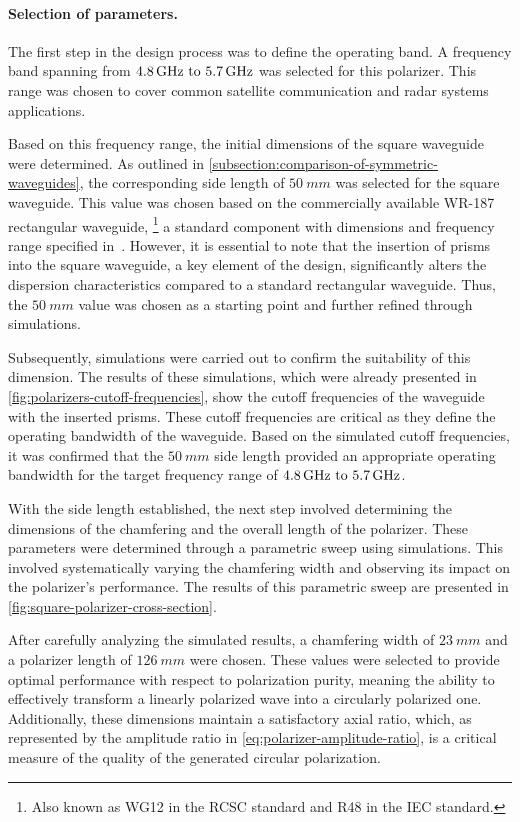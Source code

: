 \documentclass[14pt,a4paper]{ntust_report}
\begin{document}
\paragraph{Selection of parameters.} The first step in the design process was to define the operating band. A frequency band spanning from $\frequencyrange$ was selected for this polarizer. This range was chosen to cover common satellite communication and radar systems applications.

Based on this frequency range, the initial dimensions of the square waveguide were determined. As outlined in \cref{subsection:comparison-of-symmetric-waveguides}, the corresponding side length of $\qty{50}{mm}$ was selected for the square waveguide. This value was chosen based on the commercially available WR-187 rectangular waveguide,
    \footnote{Also known as WG12 in the RCSC standard and R48 in the IEC standard.}
a standard component with dimensions and frequency range specified in~\parencite{spinner:waveguide-specifications}. However, it is essential to note that the insertion of prisms into the square waveguide, a key element of the design, significantly alters the dispersion characteristics compared to a standard rectangular waveguide. Thus, the $\qty{50}{mm}$ value was chosen as a starting point and further refined through simulations.

Subsequently, simulations were carried out to confirm the suitability of this dimension. The results of these simulations, which were already presented in \cref{fig:polarizers-cutoff-frequencies}, show the cutoff frequencies of the waveguide with the inserted prisms. These cutoff frequencies are critical as they define the operating bandwidth of the waveguide. Based on the simulated cutoff frequencies, it was confirmed that the $\qty{50}{mm}$ side length provided an appropriate operating bandwidth for the target frequency range of $\frequencyrange$.

With the side length established, the next step involved determining the dimensions of the chamfering and the overall length of the polarizer. These parameters were determined through a parametric sweep using simulations. This involved systematically varying the chamfering width and observing its impact on the polarizer's performance. The results of this parametric sweep are presented in \cref{fig:square-polarizer-cross-section}.

After carefully analyzing the simulated results, a chamfering width of $\qty{23}{mm}$ and a polarizer length of $\qty{126}{mm}$ were chosen. These values were selected to provide optimal performance with respect to polarization purity, meaning the ability to effectively transform a linearly polarized wave into a circularly polarized one. Additionally, these dimensions maintain a satisfactory axial ratio, which, as represented by the amplitude ratio in \cref{eq:polarizer-amplitude-ratio}, is a critical measure of the quality of the generated circular polarization.
\end{document}
